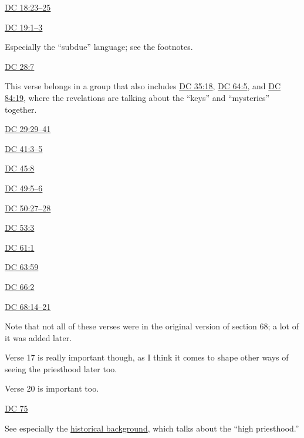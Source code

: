		\begin{compactdesc}
			\item[{\hyperref[DC18-23]{DC 18:23--25}}]
			\item[{\hyperref[DC19-1]{DC 19:1--3}}] \phantom{.}
				\begin{compactitem}
					\item Especially the ``subdue'' language; see the footnotes.
				\end{compactitem}
			\item[{\hyperref[DC28-7]{DC 28:7}}] \phantom{.}
				\begin{compactitem}
					\item This verse belongs in a group that also includes \hyperref[DC35-18]{DC 35:18}, \hyperref[DC64-5]{DC 64:5}, and \hyperref[DC84:19]{DC 84:19}, where the revelations are talking about the ``keys'' and ``mysteries'' together.
				\end{compactitem}
			\item[{\hyperref[DC29-29]{DC 29:29--41}}]
			\item[{\hyperref[DC41-3]{DC 41:3--5}}]
			\item[{\hyperref[DC45-8]{DC 45:8}}] 
			\item[{\hyperref[DC49-5]{DC 49:5--6}}] 
			\item[{\hyperref[DC50-27]{DC 50:27--28}}]
			\item[{\hyperref[DC53-3]{DC 53:3}}]
			\item[{\hyperref[DC61-1]{DC 61:1}}]
			\item[{\hyperref[DC63-59]{DC 63:59}}]
			\item[{\hyperref[DC66-2]{DC 66:2}}]
			\item[{\hyperref[DC68-14]{DC 68:14--21}}] \phantom{.}
				\begin{compactitem}
					\item Note that not all of these verses were in the original version of section 68; a lot of it was added later.
					\item Verse 17 is really important though, as I think it comes to shape other ways of seeing the priesthood later too.
					\item Verse 20 is important too.
				\end{compactitem}
			\item[{\hyperref[DC75]{DC 75}}] \phantom{.}
				\begin{compactitem}
					\item See especially the \hyperref[DC75-HB]{historical background}, which talks about the ``high priesthood.''

\end{compactitem}
\end{compactdesc}
